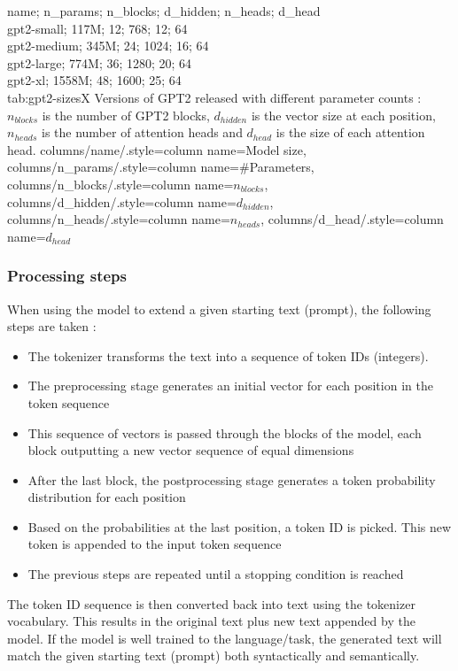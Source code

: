 {
    name; n_params; n_blocks; d_hidden; n_heads; d_head\\
    gpt2-small; 117M; 12; 768; 12; 64 \\
    gpt2-medium; 345M; 24; 1024; 16; 64 \\
    gpt2-large; 774M; 36; 1280; 20; 64 \\
    gpt2-xl; 1558M; 48; 1600; 25; 64 \\
}
{tab:gpt2-sizesX}
{
    Versions of GPT2 released with different parameter counts \cite{hfpretrained}: $n_{blocks}$ is the number of GPT2 blocks, $d_{hidden}$ is the vector size at each position, $n_{heads}$ is the number of attention heads and $d_{head}$ is the size of each attention head.
}
{%
    columns/name/.style={column name={Model size}},
    columns/n_params/.style={column name={\#Parameters}},
    columns/n_blocks/.style={column name={$n_{blocks}$}},
    columns/d_hidden/.style={column name={$d_{hidden}$}},
    columns/n_heads/.style={column name={$n_{heads}$}},
    columns/d_head/.style={column name={$d_{head}$}}
}

\subsubsection{Processing steps}

When using the model to extend a given starting text (prompt), the following steps are taken \cite{alammar-gpt2} :

\begin{itemize}
\item The tokenizer transforms the text into a sequence of token IDs (integers).
\item The preprocessing stage generates an initial vector for each position in the token sequence
\item This sequence of vectors is passed through the blocks of the model, each block outputting a new vector sequence of equal dimensions
\item After the last block, the postprocessing stage generates a token probability distribution for each position
\item Based on the probabilities at the last position, a token ID is picked. This new token is appended to the input token sequence
\item The previous steps are repeated until a stopping condition is reached
\end{itemize}

The token ID sequence is then converted back into text using the tokenizer vocabulary. This results in the original text plus new text appended by the model. If the model is well trained to the language/task, the generated text will match the given starting text (prompt) both syntactically and semantically.

